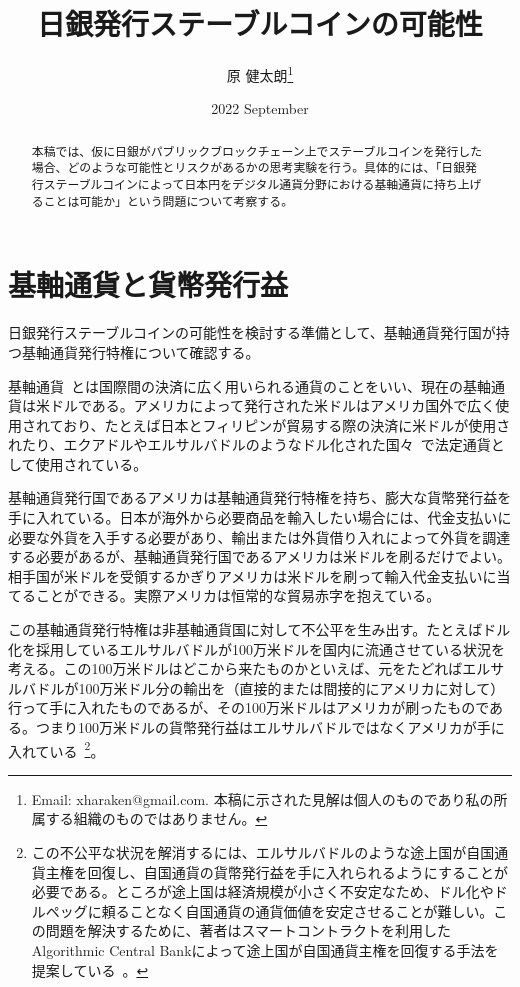 \documentclass[dvipdfmx,a4paper]{jsarticle}
\title{\textbf{日銀発行ステーブルコインの可能性}}
\author{原 健太朗\footnote{Email: xharaken@gmail.com. 本稿に示された見解は個人のものであり私の所属する組織のものではありません。}}
\date{2022 September}
\begin{document}
\maketitle

\begin{abstract}

本稿では、仮に日銀がパブリックブロックチェーン上でステーブルコインを発行した場合、どのような可能性とリスクがあるかの思考実験を行う。具体的には、「日銀発行ステーブルコインによって日本円をデジタル通貨分野における基軸通貨に持ち上げることは可能か」という問題について考察する。

\end{abstract}

\section{基軸通貨と貨幣発行益}

日銀発行ステーブルコインの可能性を検討する準備として、基軸通貨発行国が持つ基軸通貨発行特権について確認する。

基軸通貨~\cite{monetarytheory,robert2004international}とは国際間の決済に広く用いられる通貨のことをいい、現在の基軸通貨は米ドルである。アメリカによって発行された米ドルはアメリカ国外で広く使用されており、たとえば日本とフィリピンが貿易する際の決済に米ドルが使用されたり、エクアドルやエルサルバドルのようなドル化された国々~\cite{calvo2002dollarization,selgin2005currency}で法定通貨として使用されている。

基軸通貨発行国であるアメリカは基軸通貨発行特権を持ち、膨大な貨幣発行益を手に入れている。日本が海外から必要商品を輸入したい場合には、代金支払いに必要な外貨を入手する必要があり、輸出または外貨借り入れによって外貨を調達する必要があるが、基軸通貨発行国であるアメリカは米ドルを刷るだけでよい。相手国が米ドルを受領するかぎりアメリカは米ドルを刷って輸入代金支払いに当てることができる。実際アメリカは恒常的な貿易赤字を抱えている。

この基軸通貨発行特権は非基軸通貨国に対して不公平を生み出す。たとえばドル化を採用しているエルサルバドルが100万米ドルを国内に流通させている状況を考える。この100万米ドルはどこから来たものかといえば、元をたどればエルサルバドルが100万米ドル分の輸出を（直接的または間接的にアメリカに対して）行って手に入れたものであるが、その100万米ドルはアメリカが刷ったものである。つまり100万米ドルの貨幣発行益はエルサルバドルではなくアメリカが手に入れている~\footnote{この不公平な状況を解消するには、エルサルバドルのような途上国が自国通貨主権を回復し、自国通貨の貨幣発行益を手に入れられるようにすることが必要である。ところが途上国は経済規模が小さく不安定なため、ドル化やドルペッグに頼ることなく自国通貨の通貨価値を安定させることが難しい。この問題を解決するために、著者はスマートコントラクトを利用したAlgorithmic Central Bankによって途上国が自国通貨主権を回復する手法を提案している~\cite{johnlawcoinacb}。}。
\end{document}
